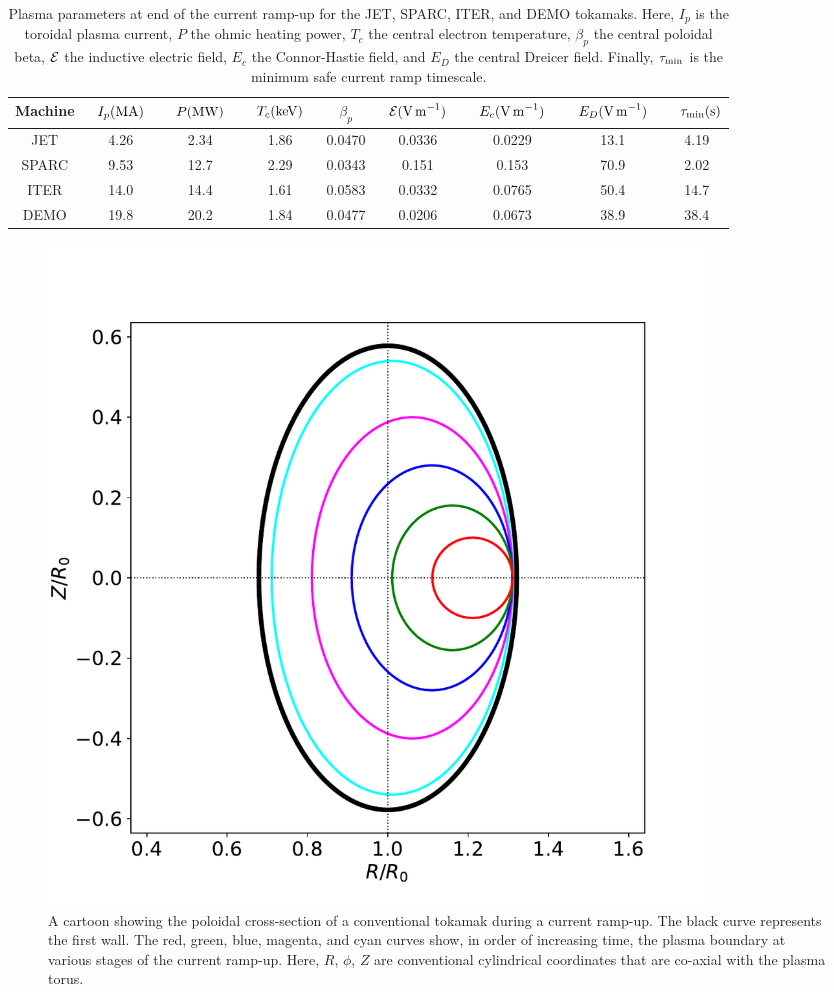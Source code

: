 \documentclass{iopjournal}
\begin{document}
\begin{table}
\begin{tabular}{ccccccccc}\hline
Machine & ~$I_p({\rm MA})$~ & ~$P({\rm MW})$~ & ~$T_c({\rm keV})$~ &~$\beta_p$~& ~${\cal E}({\rm V\,m}^{-1})$~ & ~$E_c({\rm V\,m}^{-1})$~ & ~$E_D({\rm V\,m}^{-1})$~& ~$\tau_{\rm min}({\rm s)}$\\ \hline
JET & 4.26 & 2.34& 1.86  &0.0470& 0.0336&0.0229&13.1 & 4.19\\[0.5ex]
SPARC & 9.53& 12.7 & 2.29  &0.0343& 0.151&0.153&70.9& 2.02\\[0.5ex]
ITER & 14.0 & 14.4 & 1.61  &0.0583& 0.0332&0.0765& 50.4&14.7\\[0.5ex]
DEMO &19.8 & 20.2 & 1.84 & 0.0477 & 0.0206 & 0.0673 & 38.9& 38.4
\end{tabular}
\caption{Plasma parameters at end of the current ramp-up for the JET, SPARC, ITER, and DEMO tokamaks. Here, $I_p$ is the toroidal plasma current, $P$ the
ohmic heating power, $T_c$ the central electron temperature, $\beta_p$ the central poloidal beta, ${\cal E}$ the inductive
electric field, $E_c$ the Connor-Hastie field, and $E_D$ the central Dreicer field. Finally, $\tau_{\rm min}$ is the minimum safe current ramp timescale.  }\label{t2}
\end{table}

\begin{figure}
\centerline{\includegraphics[width=0.85\textwidth]{Figure1.pdf}}
\caption{A cartoon showing the poloidal cross-section of a conventional tokamak during a current ramp-up. The black curve represents the first wall. The
red, green, blue, magenta, and cyan curves show, in order of increasing time, the plasma boundary at various stages of the current ramp-up.
Here, $R$, $\phi$, $Z$ are conventional cylindrical coordinates that are co-axial with the plasma torus. }\label{fig1}
\end{figure}
\end{document}
